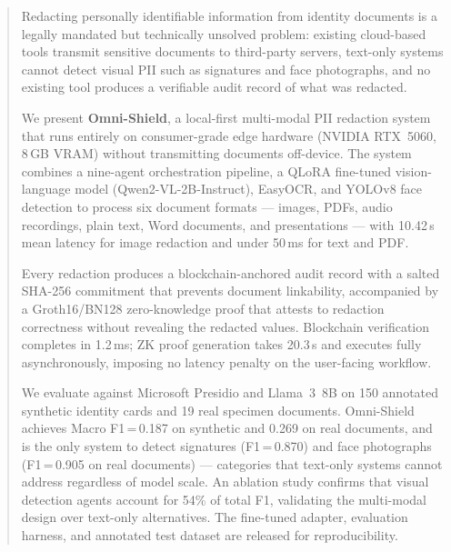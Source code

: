 \begin{abstract}

Redacting personally identifiable information from
identity documents is a legally mandated but technically
unsolved problem: existing cloud-based tools transmit
sensitive documents to third-party servers, text-only
systems cannot detect visual PII such as signatures
and face photographs, and no existing tool produces a
verifiable audit record of what was redacted.

We present \textbf{Omni-Shield}, a local-first
multi-modal PII redaction system that runs entirely
on consumer-grade edge hardware (NVIDIA RTX~5060,
8\,GB VRAM) without transmitting documents off-device.
The system combines a nine-agent orchestration
pipeline, a QLoRA fine-tuned vision-language model
(Qwen2-VL-2B-Instruct), EasyOCR, and YOLOv8 face
detection to process six document formats --- images,
PDFs, audio recordings, plain text, Word documents,
and presentations --- with 10.42\,s mean latency for
image redaction and under 50\,ms for text and PDF.

Every redaction produces a blockchain-anchored audit
record with a salted SHA-256 commitment that prevents
document linkability, accompanied by a Groth16/BN128
zero-knowledge proof that attests to redaction
correctness without revealing the redacted values.
Blockchain verification completes in 1.2\,ms;
ZK proof generation takes 20.3\,s and executes
fully asynchronously, imposing no latency penalty
on the user-facing workflow.

We evaluate against Microsoft Presidio and Llama~3~8B
on 150 annotated synthetic identity cards and 19 real
specimen documents.
Omni-Shield achieves Macro F1\,=\,0.187 on synthetic
and 0.269 on real documents, and is the only system
to detect signatures (F1\,=\,0.870) and face
photographs (F1\,=\,0.905 on real documents) ---
categories that text-only systems cannot address
regardless of model scale.
An ablation study confirms that visual detection
agents account for 54\% of total F1, validating
the multi-modal design over text-only alternatives.
The fine-tuned adapter, evaluation harness, and
annotated test dataset are released for reproducibility.

\end{abstract}
